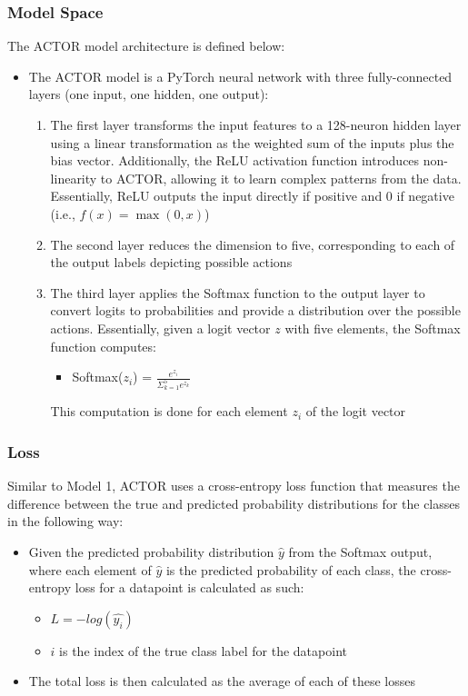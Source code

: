 \documentclass[11pt]{article}
\begin{document}
\subsubsection{Model Space}

The ACTOR model architecture is defined below:

\begin{itemize}
    \item The ACTOR model is a PyTorch neural network with three fully-connected layers (one input, one hidden, one output):
    \begin{enumerate}
        \item The first layer transforms the input features to a 128-neuron hidden layer using a linear transformation as the weighted sum of the inputs plus the bias vector. Additionally, the ReLU activation function introduces non-linearity to ACTOR, allowing it to learn complex patterns from the data. Essentially, ReLU outputs the input directly if positive and 0 if negative (i.e., $f(x) = \max(0, x)$)
        \item The second layer reduces the dimension to five, corresponding to each of the output labels depicting possible actions
        \item The third layer applies the Softmax function to the output layer to convert logits to probabilities and provide a distribution over the possible actions. Essentially, given a logit vector $z$ with five elements, the Softmax function computes:
        \begin{itemize}
            \item Softmax($z_i$) = $\frac{e^{z_i}}{\Sigma_{k=1}^5 e^{z_k}}$
        \end{itemize}
        This computation is done for each element $z_i$ of the logit vector
    \end{enumerate}
\end{itemize}

\subsubsection{Loss}

Similar to Model 1, ACTOR uses a cross-entropy loss function that measures the difference between the true and predicted probability distributions for the classes in the following way:

\begin{itemize}
    \item Given the predicted probability distribution $\hat{y}$ from the Softmax output, where each element of $\hat{y}$ is the predicted probability of each class, the cross-entropy loss for a datapoint is calculated as such:
    \begin{itemize}
        \item $L = - log(\hat{y_i})$
        \item $i$ is the index of the true class label for the datapoint
    \end{itemize}
    \item The total loss is then calculated as the average of each of these losses
\end{itemize}
\end{document}
